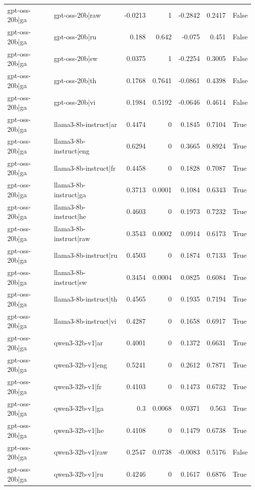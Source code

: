 \begin{table}
\begin{tabular}{l l r r r r l}
gpt-oss-20b|ga & gpt-oss-20b|raw & -0.0213 & 1 & -0.2842 & 0.2417 & False \\
gpt-oss-20b|ga & gpt-oss-20b|ru & 0.188 & 0.642 & -0.075 & 0.451 & False \\
gpt-oss-20b|ga & gpt-oss-20b|sw & 0.0375 & 1 & -0.2254 & 0.3005 & False \\
gpt-oss-20b|ga & gpt-oss-20b|th & 0.1768 & 0.7641 & -0.0861 & 0.4398 & False \\
gpt-oss-20b|ga & gpt-oss-20b|vi & 0.1984 & 0.5192 & -0.0646 & 0.4614 & False \\
gpt-oss-20b|ga & llama3-8b-instruct|ar & 0.4474 & 0 & 0.1845 & 0.7104 & True \\
gpt-oss-20b|ga & llama3-8b-instruct|eng & 0.6294 & 0 & 0.3665 & 0.8924 & True \\
gpt-oss-20b|ga & llama3-8b-instruct|fr & 0.4458 & 0 & 0.1828 & 0.7087 & True \\
gpt-oss-20b|ga & llama3-8b-instruct|ga & 0.3713 & 0.0001 & 0.1084 & 0.6343 & True \\
gpt-oss-20b|ga & llama3-8b-instruct|he & 0.4603 & 0 & 0.1973 & 0.7232 & True \\
gpt-oss-20b|ga & llama3-8b-instruct|raw & 0.3543 & 0.0002 & 0.0914 & 0.6173 & True \\
gpt-oss-20b|ga & llama3-8b-instruct|ru & 0.4503 & 0 & 0.1874 & 0.7133 & True \\
gpt-oss-20b|ga & llama3-8b-instruct|sw & 0.3454 & 0.0004 & 0.0825 & 0.6084 & True \\
gpt-oss-20b|ga & llama3-8b-instruct|th & 0.4565 & 0 & 0.1935 & 0.7194 & True \\
gpt-oss-20b|ga & llama3-8b-instruct|vi & 0.4287 & 0 & 0.1658 & 0.6917 & True \\
gpt-oss-20b|ga & qwen3-32b-v1|ar & 0.4001 & 0 & 0.1372 & 0.6631 & True \\
gpt-oss-20b|ga & qwen3-32b-v1|eng & 0.5241 & 0 & 0.2612 & 0.7871 & True \\
gpt-oss-20b|ga & qwen3-32b-v1|fr & 0.4103 & 0 & 0.1473 & 0.6732 & True \\
gpt-oss-20b|ga & qwen3-32b-v1|ga & 0.3 & 0.0068 & 0.0371 & 0.563 & True \\
gpt-oss-20b|ga & qwen3-32b-v1|he & 0.4108 & 0 & 0.1479 & 0.6738 & True \\
gpt-oss-20b|ga & qwen3-32b-v1|raw & 0.2547 & 0.0738 & -0.0083 & 0.5176 & False \\
gpt-oss-20b|ga & qwen3-32b-v1|ru & 0.4246 & 0 & 0.1617 & 0.6876 & True \\

\end{tabular}
\end{table}
